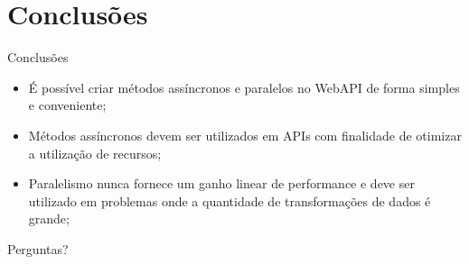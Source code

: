 \documentclass[10pt]{beamer}
\begin{document}
\section{Conclusões}

\begin{frame}{Conclusões}
	\begin{itemize}
		\item É possível criar métodos assíncronos e paralelos no WebAPI de forma simples e conveniente; 
		\item Métodos assíncronos devem ser utilizados em APIs com finalidade de otimizar a utilização de recursos;
		\item Paralelismo nunca fornece um ganho linear de performance e deve ser utilizado em problemas onde a quantidade de transformações de dados é grande;
	\end{itemize}
\end{frame}


\begin{frame}[standout]
  Perguntas?
\end{frame}
\end{document}
